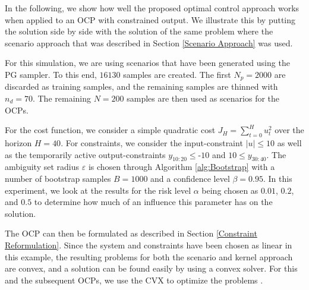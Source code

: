 In the following, we show how well the proposed optimal control approach works when applied to an OCP with constrained output. We illustrate this by putting the solution side by side with the solution of the same problem where the scenario approach that was described in Section \ref{Scenario Approach} was used. 

For this simulation, we are using scenarios that have been generated using the PG sampler. To this end, $16130$ samples are created. The first $N_p = 2000$ are discarded as training samples, and the remaining samples are thinned with $n_d = 70$. The remaining $N = 200$ samples are then used as scenarios for the OCPs.

For the cost function, we consider a simple quadratic cost $J_H = \sum_{t = 0}^H u_t^2$ over the horizon $H = 40$. For constraints, we consider the input-constraint $\left| u \right| \leq 10$ as well as the temporarily active output-constraints $y_{10:20} \leq \text{-} 10$ and $10 \leq y_{30:40}$.  The ambiguity set radius $\varepsilon$ is chosen through Algorithm \ref{alg:Bootstrap} with a number of bootstrap samples $B = 1000$ and a confidence level $\beta = 0.95$. In this experiment, we look at the results for the risk level $\alpha$ being chosen as $0.01$, $0.2$, and $0.5$ to determine how much of an influence this parameter has on the solution.

The OCP can then be formulated as described in Section \ref{Constraint Reformulation}. Since the system and constraints have been chosen as linear in this example, the resulting problems for both the scenario and kernel approach are convex, and a solution can be found easily by using a convex solver. For this and the subsequent OCPs, we use the CVX to optimize the problems \cite{Becker_11}.

